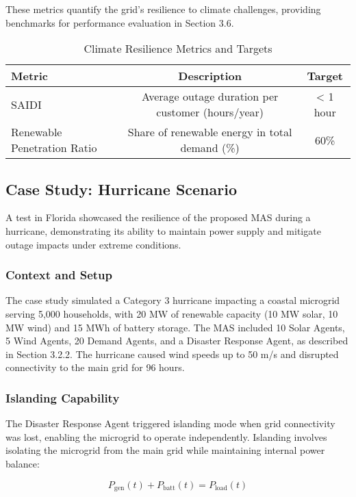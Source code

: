 \documentclass[12pt]{article}
\begin{document}
These metrics quantify the grid’s resilience to climate challenges, providing benchmarks for performance evaluation in Section 3.6.

\begin{table}[h]
\centering
\caption{Climate Resilience Metrics and Targets}
\label{tab:resilience_metrics}
\begin{tabular}{lcc}
\toprule
\textbf{Metric} & \textbf{Description} & \textbf{Target} \\
\midrule
SAIDI & Average outage duration per customer (hours/year) & < 1 hour \\
Renewable Penetration Ratio & Share of renewable energy in total demand (\%) & 60\% \\
\bottomrule
\end{tabular}
\end{table}

\subsection{Case Study: Hurricane Scenario}

A test in Florida showcased the resilience of the proposed MAS during a hurricane, demonstrating its ability to maintain power supply and mitigate outage impacts under extreme conditions.

\subsubsection{Context and Setup}

The case study simulated a Category 3 hurricane impacting a coastal microgrid serving 5,000 households, with 20 MW of renewable capacity (10 MW solar, 10 MW wind) and 15 MWh of battery storage. The MAS included 10 Solar Agents, 5 Wind Agents, 20 Demand Agents, and a Disaster Response Agent, as described in Section 3.2.2. The hurricane caused wind speeds up to 50 m/s and disrupted connectivity to the main grid for 96 hours.

\subsubsection{Islanding Capability}

The Disaster Response Agent triggered islanding mode when grid connectivity was lost, enabling the microgrid to operate independently. Islanding involves isolating the microgrid from the main grid while maintaining internal power balance:

\[
P_{\text{gen}}(t) + P_{\text{batt}}(t) = P_{\text{load}}(t)
\]
\end{document}
